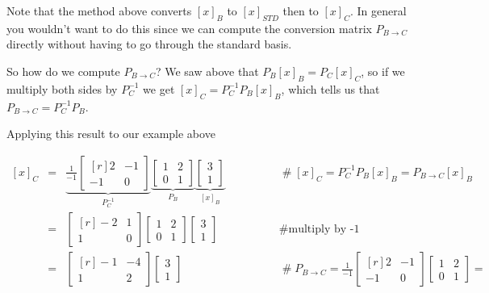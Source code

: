 \documentclass[11pt, oneside]{article}   	%
\begin{document}
\bigskip
\noindent
Note that the method above converts $[x]_B$ to $[x]_{STD}$ then to $[x]_C$. In general you wouldn't want to do this since we can compute the conversion matrix
$P_{B \rightarrow C}$ directly without having to go through the standard basis. 

\bigskip
\noindent
So how do we compute $P_{B \rightarrow C}$?  We saw above that  $P_{B}[x]_B =  P_{C}[x]_C$, so if we multiply 
both sides by $P^{-1}_C$ we get  $[x]_C = P^{-1}_{C} P_{B} [x]_B$, which tells us that $P_{B \rightarrow C} = P^{-1}_{C} P_{B}$.


\bigskip
\noindent
Applying this result to our example above

\begin{equation*}
\begin{array}{rcll}
[x]_C
&=& \underbrace{ \frac{1}{-1}  \begin{bmatrix}[r] 2 & -1 \\ -1 & 0 \end{bmatrix}}_{P^{-1}_C}
        \underbrace{\begin{bmatrix} 1 & 2  \\ 0 & 1 \end{bmatrix}}_{P_B}
        \underbrace{\begin{bmatrix} 3 \\1 \end{bmatrix}}_{[x]_B}
     & \qquad \qquad \mathrel{\#}  [x]_C =  P^{-1}_{C} P_{B} [x]_B = P_{B \rightarrow C}  [x]_B \\
&=&  \begin{bmatrix}[r] -2 & 1 \\ 1 & 0 \end{bmatrix}  \begin{bmatrix} 1 & 2  \\ 0 & 1 \end{bmatrix} \begin{bmatrix} 3 \\1 \end{bmatrix}
     & \qquad\qquad \mathrel{\#}  \text{multiply by -1 }  \\
&=&  \begin{bmatrix}[r] -1 & -4 \\ 1 & 2 \end{bmatrix} \begin{bmatrix} 3 \\1 \end{bmatrix}
     & \qquad \qquad \mathrel{\#}  P_{B \rightarrow C} = \frac{1}{-1}  \begin{bmatrix}[r] 2 & -1 \\ -1 & 0 \end{bmatrix} \begin{bmatrix} 1 & 2  \\ 0 & 1 \end{bmatrix} =  

\end{array}
\end{equation*}
\end{document}
